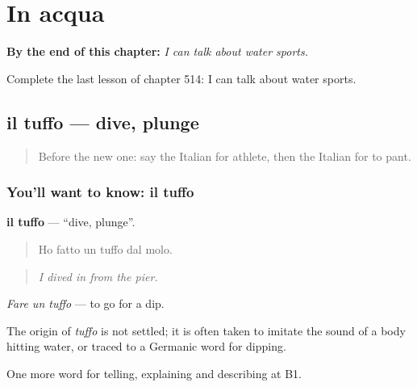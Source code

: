 
\chapter{In acqua}
\label{ch:it-in-acqua}

\begin{chapteropening}
\textbf{By the end of this chapter:} \emph{I can talk about water sports.}

Complete the last lesson of chapter 514: I can talk about water sports.
\end{chapteropening}

\section[il tuffo]{il tuffo — dive, plunge}

\label{lesson:IT-C514-tuffo}



\begin{quote}
Before the new one: say the Italian for athlete, then the Italian for to pant.
\end{quote}

\subsection*{You'll want to know: il tuffo}
\textbf{il tuffo} — \textquotedblleft{}dive, plunge\textquotedblright{}.

\begin{quote}
Ho fatto un tuffo dal molo.
\end{quote}

\begin{quote}
\emph{I dived in from the pier.}
\end{quote}

\emph{Fare un tuffo} — to go for a dip.

\begin{cousinweb}
The origin of \emph{tuffo} is not settled; it is often taken to imitate the sound of a body hitting water, or traced to a Germanic word for dipping.
\end{cousinweb}

\begin{grammarlens}[title={What you've built}]
One more word for telling, explaining and describing at B1.
\end{grammarlens}

